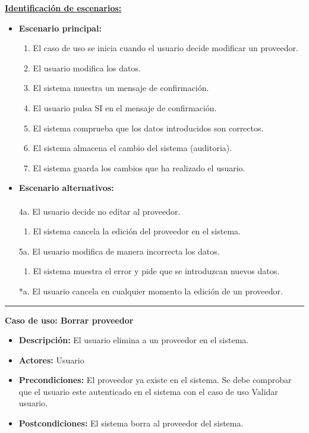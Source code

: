 \underline{\textbf{Identificación de escenarios:}}
\begin{itemize}\renewcommand{\labelitemi}{$\circ$}
 \item \textbf{Escenario principal:}
         \begin{enumerate}
          \item El caso de uso se inicia cuando el usuario decide modificar un proveedor.
          \item El usuario modifica los datos.
          \item El sistema muestra un mensaje de confirmación.
          \item El usuario pulsa SI en el mensaje de confirmación.
          \item El sistema comprueba que los datos introducidos son correctos.
 	  \item El sistema almacena el cambio del sistema (auditoria).
          \item El sistema guarda los cambios que ha realizado el usuario.
         \end{enumerate}
  \item \textbf{Escenario alternativos:}\\\\
	4a. El usuario decide no editar al proveedor.
	      \begin{enumerate}
	       \item El sistema cancela la edición del proveedor en el sistema.
	      \end{enumerate}
           5a. El usuario modifica de manera incorrecta los datos.
		\begin{enumerate}
		 \item El sistema muestra el error y pide que se introduzcan nuevos datos.
		\end{enumerate}
          *a. El usuario cancela en cualquier momento la edición de un proveedor.
\end{itemize}
\smallskip
\hrule height 1pt
\smallskip
\textbf{Caso de uso: Borrar proveedor}
\begin{itemize}\renewcommand{\labelitemi}{$\cdot$}
 \item \textbf{Descripción:} El usuario elimina a un proveedor en el sistema.
  \item \textbf{Actores:} Usuario
  \item \textbf{Precondiciones:} El proveedor ya existe en el sistema. Se debe comprobar que el usuario este autenticado en el sistema con el caso de uso Validar usuario.
  \item \textbf{Postcondiciones:} El sistema borra al proveedor del sistema.
\end{itemize}
